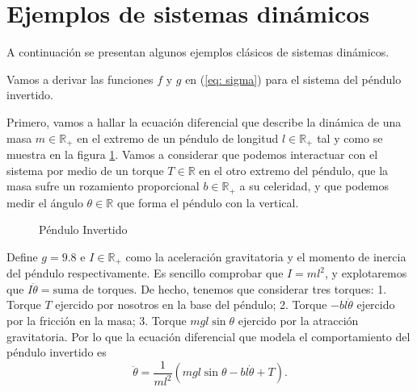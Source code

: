 \section{Ejemplos de sistemas dinámicos}\label{sec: ejem}
A continuación se presentan algunos ejemplos clásicos de sistemas dinámicos.
\begin{example}

Vamos a derivar las funciones $f$ y $g$ en (\ref{eq: sigma}) para el sistema del péndulo invertido.

Primero, vamos a hallar la ecuación diferencial que describe la dinámica de una masa $m\in\mathbb{R}_+$ en el extremo de un péndulo de longitud $l\in\mathbb{R}_+$ tal y como se muestra en la figura \ref{fig: invpen}. Vamos a considerar que podemos interactuar con el sistema por medio de un torque $T\in\mathbb{R}$ en el otro extremo del péndulo, que la masa sufre un rozamiento proporcional $b\in\mathbb{R}_+$ a su celeridad, y que podemos medir el ángulo $\theta\in\mathbb{R}$ que forma el péndulo con la vertical.

\begin{figure}[!ht]
\centering
{}
\caption{Péndulo Invertido}
\label{fig: invpen}
\end{figure}

Define $g = 9.8$ e $I\in\mathbb{R}_+$ como la aceleración gravitatoria y el momento de inercia del péndulo respectivamente. Es sencillo comprobar que $I = ml^2$, y explotaremos que $I \ddot\theta = \text{suma de torques}$. De hecho, tenemos que considerar tres torques: 1. Torque $T$ ejercido por nosotros en la base del péndulo; 2. Torque $-bl\dot\theta$ ejercido por la fricción en la masa; 3. Torque $mgl \sin\theta$ ejercido por la atracción gravitatoria. Por lo que la ecuación diferencial que modela el comportamiento del péndulo invertido es
\begin{equation}
\ddot\theta = \frac{1}{ml^2}\left(mgl\sin{\theta}-bl\dot\theta + T\right).
\label{eq: dyn}
\end{equation}


\end{example}
